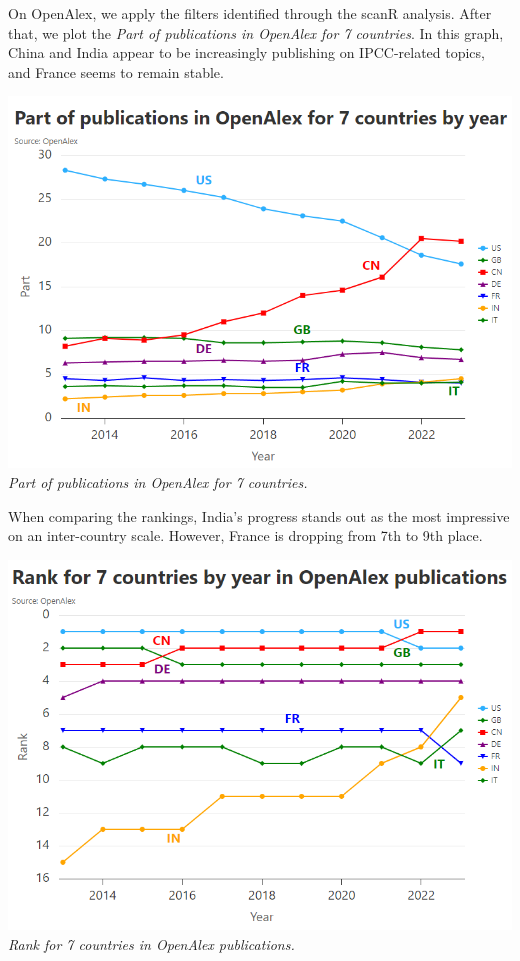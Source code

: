 \documentclass[
]{article}
\begin{document}
On OpenAlex, we apply the filters identified through the scanR analysis.
After that, we plot the \emph{Part of publications in OpenAlex for 7
countries}. In this graph, China and India appear to be increasingly
publishing on IPCC-related topics, and France seems to remain stable.

\includegraphics{./images/teds_OA_part7.png} \emph{Part of publications
in OpenAlex for 7 countries.}

When comparing the rankings, India's progress stands out as the most
impressive on an inter-country scale. However, France is dropping from
7th to 9th place.

\includegraphics{./images/teds_OA_rank7.png} \emph{Rank for 7 countries
in OpenAlex publications.}
\end{document}

